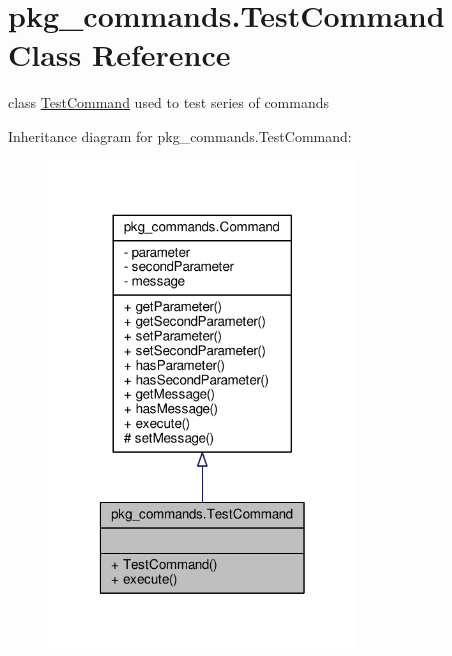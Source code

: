 \hypertarget{classpkg__commands_1_1TestCommand}{\section{pkg\-\_\-commands.\-Test\-Command Class Reference}
\label{classpkg__commands_1_1TestCommand}
}


class \hyperlink{classpkg__commands_1_1TestCommand}{Test\-Command} used to test series of commands  




Inheritance diagram for pkg\-\_\-commands.\-Test\-Command\-:
\nopagebreak
\begin{figure}[H]
\begin{center}
\leavevmode
\includegraphics[width=232pt]{classpkg__commands_1_1TestCommand__inherit__graph}
\end{center}
\end{figure}


